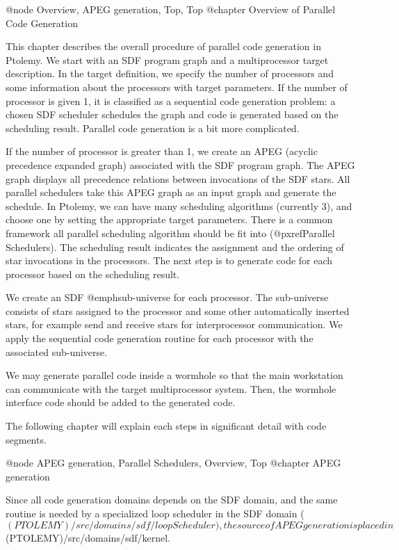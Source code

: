 @node Overview, APEG generation, Top, Top
@chapter Overview of Parallel Code Generation

This chapter describes the overall procedure of parallel code generation
in Ptolemy. We start with an SDF program graph and a multiprocessor
target description. In the target definition, we specify the number of
processors and some information about the processors with target parameters.
If the number of processor is given 1, it is classified as a sequential
code generation problem: a chosen
SDF scheduler schedules the graph and code is generated based on the
scheduling result. Parallel code generation is a bit more complicated.

If the number of processor is greater than 1, we create an APEG (acyclic
precedence expanded graph) associated with the SDF program graph. The APEG
graph displays all precedence relations between invocations of the SDF
stars. All parallel schedulers take this APEG graph as an input graph
and generate the schedule. In Ptolemy, we can have many scheduling
algorithms (currently 3), and choose one by setting the appropriate
target parameters. There is a common framework all parallel scheduling
algorithm should be fit into (@pxref{Parallel Schedulers}). The scheduling
result indicates the assignment and the ordering of star invocations
in the processors. The next step is to generate code for each processor
based on the scheduling result.

We create an SDF @emph{sub-universe} for each processor. The sub-universe
consists of stars assigned to the processor and some other automatically
inserted stars, for example send and receive stars for interprocessor
communication. We apply the sequential code generation routine for
each processor with the associated sub-universe.

We may generate parallel code inside a wormhole so that the main
workstation can communicate with the target multiprocessor system. 
Then, the wormhole interface code should be added to the generated code.

The following chapter will explain each steps in significant detail with
code segments.
 
@node APEG generation, Parallel Schedulers, Overview, Top
@chapter APEG generation

Since all code generation domains depends on the SDF domain, and 
the same routine is needed by a specialized loop scheduler in the SDF
domain ($(PTOLEMY)/src/domains/sdf/loopScheduler), the source of APEG 
generation is placed in $(PTOLEMY)/src/domains/sdf/kernel.

